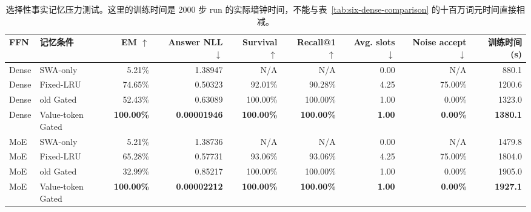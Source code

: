\documentclass[letterpaper]{article}
\begin{document}
\begin{table}[t]
\centering
\scriptsize
\caption{选择性事实记忆压力测试。这里的训练时间是 2000 步 run 的实际墙钟时间，不能与表~\ref{tab:six-dense-comparison} 的十百万词元时间直接相减。}
\label{tab:memory-stress-comparison}
\begin{tabular}{l l r r r r r r r}
\toprule
FFN & 记忆条件 & EM $\uparrow$ & Answer NLL $\downarrow$ & Survival $\uparrow$ & Recall@1 $\uparrow$ & Avg. slots $\downarrow$ & Noise accept $\downarrow$ & 训练时间 (s) \\
\midrule
Dense & SWA-only & 5.21\% & 1.38947 & N/A & N/A & 0.00 & N/A & 880.1 \\
Dense & Fixed-LRU & 74.65\% & 0.50323 & 92.01\% & 90.28\% & 4.25 & 75.00\% & 1200.6 \\
Dense & old Gated & 52.43\% & 0.63089 & 100.00\% & 100.00\% & 1.00 & 0.00\% & 1323.0 \\
Dense & Value-token Gated & \textbf{100.00\%} & \textbf{0.00001946} & \textbf{100.00\%} & \textbf{100.00\%} & \textbf{1.00} & \textbf{0.00\%} & \textbf{1380.1} \\
MoE & SWA-only & 5.21\% & 1.38736 & N/A & N/A & 0.00 & N/A & 1479.8 \\
MoE & Fixed-LRU & 65.28\% & 0.57731 & 93.06\% & 93.06\% & 4.25 & 75.00\% & 1804.0 \\
MoE & old Gated & 32.99\% & 0.85217 & 100.00\% & 100.00\% & 1.00 & 0.00\% & 1905.0 \\
MoE & Value-token Gated & \textbf{100.00\%} & \textbf{0.00002212} & \textbf{100.00\%} & \textbf{100.00\%} & \textbf{1.00} & \textbf{0.00\%} & \textbf{1927.1} \\
\bottomrule
\end{tabular}
\end{table}
\end{document}
